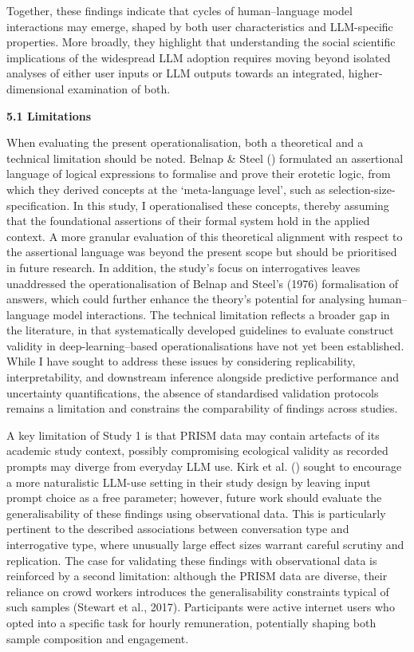 \documentclass[
  12pt,
]{article}
\begin{document}
Together, these findings indicate that cycles of human--language model interactions may emerge, shaped by both user characteristics and LLM-specific properties. More broadly, they highlight that understanding the social scientific implications of the widespread LLM adoption requires moving beyond isolated analyses of either user inputs or LLM outputs towards an integrated, higher-dimensional examination of both.

\textbf{5.1 Limitations}

When evaluating the present operationalisation, both a theoretical and a technical limitation should be noted. Belnap \& Steel () formulated an assertional language of logical expressions to formalise and prove their erotetic logic, from which they derived concepts at the `meta-language level', such as selection-size-specification. In this study, I operationalised these concepts, thereby assuming that the foundational assertions of their formal system hold in the applied context. A more granular evaluation of this theoretical alignment with respect to the assertional language was beyond the present scope but should be prioritised in future research. In addition, the study's focus on interrogatives leaves unaddressed the operationalisation of Belnap and Steel's (1976) formalisation of answers, which could further enhance the theory's potential for analysing human--language model interactions. The technical limitation reflects a broader gap in the literature, in that systematically developed guidelines to evaluate construct validity in deep-learning--based operationalisations have not yet been established. While I have sought to address these issues by considering replicability, interpretability, and downstream inference alongside predictive performance and uncertainty quantifications, the absence of standardised validation protocols remains a limitation and constrains the comparability of findings across studies.

A key limitation of Study 1 is that PRISM data may contain artefacts of its academic study context, possibly compromising ecological validity as recorded prompts may diverge from everyday LLM use. Kirk et al. () sought to encourage a more naturalistic LLM-use setting in their study design by leaving input prompt choice as a free parameter; however, future work should evaluate the generalisability of these findings using observational data. This is particularly pertinent to the described associations between conversation type and interrogative type, where unusually large effect sizes warrant careful scrutiny and replication. The case for validating these findings with observational data is reinforced by a second limitation: although the PRISM data are diverse, their reliance on crowd workers introduces the generalisability constraints typical of such samples (Stewart et al., 2017). Participants were active internet users who opted into a specific task for hourly remuneration, potentially shaping both sample composition and engagement.
\end{document}
